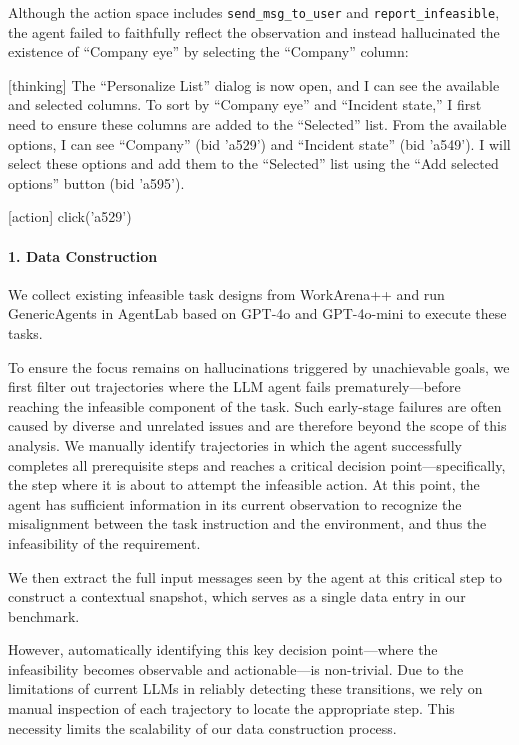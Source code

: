 Although the action space includes \texttt{send\_msg\_to\_user} and \texttt{report\_infeasible}, the agent failed to faithfully reflect the observation and instead hallucinated the existence of ``Company eye'' by selecting the ``Company'' column:


\begin{agentquote}

[thinking] The ``Personalize List'' dialog is now open, and I can see the available and selected columns. To sort by ``Company eye'' and ``Incident state,'' I first need to ensure these columns are added to the ``Selected'' list. From the available options, I can see ``Company'' (bid 'a529') and ``Incident state'' (bid 'a549'). I will select these options and add them to the ``Selected'' list using the ``Add selected options'' button (bid 'a595').

[action] click('a529')

\end{agentquote}


\paragraph{1. Data Construction}

We collect existing infeasible task designs from WorkArena++ and run GenericAgents in AgentLab based on GPT-4o and GPT-4o-mini to execute these tasks.

To ensure the focus remains on hallucinations triggered by unachievable goals, we first filter out trajectories where the LLM agent fails prematurely---before reaching the infeasible component of the task. Such early-stage failures are often caused by diverse and unrelated issues and are therefore beyond the scope of this analysis. We manually identify trajectories in which the agent successfully completes all prerequisite steps and reaches a critical decision point---specifically, the step where it is about to attempt the infeasible action. At this point, the agent has sufficient information in its current observation to recognize the misalignment between the task instruction and the environment, and thus the infeasibility of the requirement.

We then extract the full input messages seen by the agent at this critical step to construct a contextual snapshot, which serves as a single data entry in our benchmark.

However, automatically identifying this key decision point---where the infeasibility becomes observable and actionable---is non-trivial. Due to the limitations of current LLMs in reliably detecting these transitions, we rely on manual inspection of each trajectory to locate the appropriate step. This necessity limits the scalability of our data construction process.


